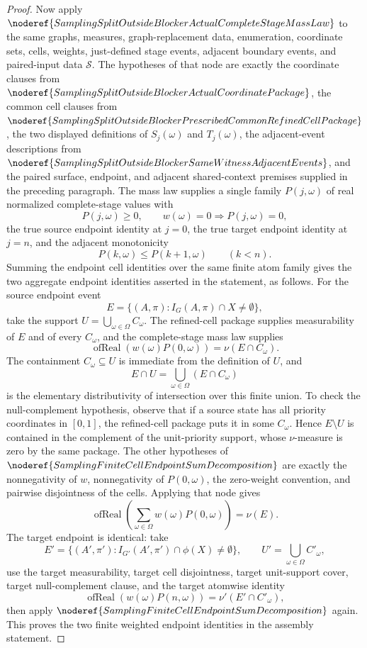 \begin{proof}
Now apply
\(\noderef{SamplingSplitOutsideBlockerActualCompleteStageMassLaw}\) to the
same graphs, measures, graph-replacement data, enumeration, coordinate
sets, cells, weights, just-defined stage events, adjacent boundary events,
and paired-input data \(\mathcal S\).  The hypotheses of that node are exactly
the coordinate clauses from
\(\noderef{SamplingSplitOutsideBlockerActualCoordinatePackage}\), the common
cell clauses from
\(\noderef{SamplingSplitOutsideBlockerPrescribedCommonRefinedCellPackage}\),
the two displayed definitions of \(S_j(\omega)\) and \(T_j(\omega)\), the
adjacent-event descriptions from
\(\noderef{SamplingSplitOutsideBlockerSameWitnessAdjacentEvents}\), and the
paired surface, endpoint, and adjacent shared-context premises supplied in
the preceding paragraph.  The mass law supplies a single family
\(P(j,\omega)\) of real normalized complete-stage values with
\[
  P(j,\omega)\ge0,\qquad w(\omega)=0\Rightarrow P(j,\omega)=0,
\]
the true source endpoint identity at \(j=0\), the true target endpoint
identity at \(j=n\), and the adjacent monotonicity
\[
  P(k,\omega)\le P(k+1,\omega)\qquad(k<n).
\]
Summing the endpoint cell identities over the same finite atom family gives
the two aggregate endpoint identities asserted in the statement, as follows.
For the source endpoint event
\[
  E=\{(A,\pi):I_G(A,\pi)\cap X\ne\emptyset\},
\]
take the support \(U=\bigcup_{\omega\in\Omega} C_\omega\).  The refined-cell
package supplies measurability of \(E\) and of every \(C_\omega\), and the
complete-stage mass law supplies
\[
  \operatorname{ofReal}(w(\omega)P(0,\omega))=\nu(E\cap C_\omega).
\]
The containment \(C_\omega\subseteq U\) is immediate from the definition of
\(U\), and
\[
  E\cap U=\bigcup_{\omega\in\Omega}(E\cap C_\omega)
\]
is the elementary distributivity of intersection over this finite union.  To
check the null-complement hypothesis, observe that if a source state has all
priority coordinates in \([0,1]\), the refined-cell package puts it in some
\(C_\omega\).  Hence \(E\setminus U\) is contained in the complement of the
unit-priority support, whose \(\nu\)-measure is zero by the same package.  The
other hypotheses of
\(\noderef{SamplingFiniteCellEndpointSumDecomposition}\) are exactly the
nonnegativity of \(w\), nonnegativity of \(P(0,\omega)\), the zero-weight
convention, and pairwise disjointness of the cells.  Applying that node gives
\[
  \operatorname{ofReal}\!\left(\sum_{\omega\in\Omega}w(\omega)P(0,\omega)\right)
  =\nu(E).
\]
The target endpoint is identical: take
\[
  E'=\{(A',\pi'):I_{G'}(A',\pi')\cap \phi(X)\ne\emptyset\},\qquad
  U'=\bigcup_{\omega\in\Omega} C'_\omega,
\]
use the target measurability, target cell disjointness, target unit-support
cover, target null-complement clause, and the target atomwise identity
\[
  \operatorname{ofReal}(w(\omega)P(n,\omega))=\nu'(E'\cap C'_\omega),
\]
then apply
\(\noderef{SamplingFiniteCellEndpointSumDecomposition}\) again.  This proves
the two finite weighted endpoint identities in the assembly statement.


\end{proof}
